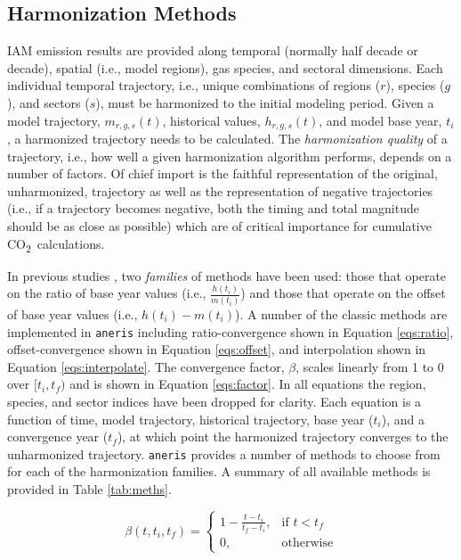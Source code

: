 \documentclass[review]{elsarticle}
\newcommand{\code}[1]{\lstinline[basicstyle=\ttfamily\color{black}]|#1|}
\newcommand{\codeb}[1]{\texttt{#1}}
\newcommand{\cotwo}{CO\textsubscript{2}~}
\begin{document}
\subsection{Harmonization Methods}

IAM emission results are provided along temporal (normally half decade or
decade), spatial (i.e., model regions), gas species, and sectoral
dimensions. Each individual temporal trajectory, i.e., unique combinations of
regions ($r$), species ($g$), and sectors ($s$), must be harmonized to the
initial modeling period. Given a model trajectory, $m_{r, g, s}(t)$, historical
values, $h_{r, g, s}(t)$, and model base year, $t_i$, a harmonized trajectory
needs to be calculated. The \textit{harmonization quality} of a trajectory,
i.e., how well a given harmonization algorithm performs, depends on a number of
factors. Of chief import is the faithful representation of the original,
unharmonized, trajectory as well as the representation of negative trajectories
(i.e., if a trajectory becomes negative, both the timing and total magnitude
should be as close as possible) which are of critical importance for cumulative
\cotwo calculations.

In previous studies \cite{meinshausen_rcp_2011,rogelj_discrepancies_2011}, two
\textit{families} of methods have been used: those that operate on the ratio of
base year values (i.e., $\frac{h(t_i)}{m(t_i)}$) and those that operate on the
offset of base year values (i.e., $h(t_i) - m(t_i)$). A number of the classic
methods are implemented in \code{aneris} including ratio-convergence shown in
Equation \ref{eqs:ratio}, offset-convergence shown in Equation \ref{eqs:offset},
and interpolation shown in Equation \ref{eqs:interpolate}. The convergence
factor, $\beta$, scales linearly from 1 to 0 over $[t_i, t_f)$ and is shown in
  Equation \ref{eqs:factor}. In all equations the region, species, and sector
  indices have been dropped for clarity. Each equation is a function of time,
  model trajectory, historical trajectory, base year ($t_i$), and a convergence
  year ($t_f$), at which point the harmonized trajectory converges to the
  unharmonized trajectory. \codeb{aneris} provides a number of methods to choose
  from for each of the harmonization families. A summary of all available
  methods is provided in Table \ref{tab:meths}.


\begin{equation}\label{eqs:factor}
  \beta(t, t_i, t_f) =
  \begin{cases}
    1 - \frac{t - t_i}{t_f - t_i},& \text{if } t < t_f\\
    0,                        & \text{otherwise}
  \end{cases}
\end{equation}
\end{document}
